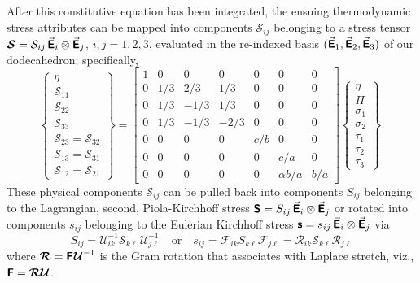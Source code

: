 After this constitutive equation has been integrated, the ensuing thermo\-dynamic stress attributes can be mapped into components $\mathcal{S}_{ij}$ belonging to a stress tensor $\boldsymbol{\mathcal{S}} = \mathcal{S}_{ij} \, \vec{\boldsymbol{\mathsf{E}}}_i \otimes \vec{\boldsymbol{\mathsf{E}}}_j$, $i, j = 1, 2, 3$, evaluated in the re-indexed basis $( \vec{\boldsymbol{\mathsf{E}}}_1 , \vec{\boldsymbol{\mathsf{E}}}_2 , \vec{\boldsymbol{\mathsf{E}}}_3 )$ of our dodecahedron; specifically,
\begin{equation}
\left\{ \begin{matrix}
\eta \\ \mathcal{S}_{11} \\ \mathcal{S}_{22} \\ \mathcal{S}_{33} \\
\mathcal{S}_{23} = \mathcal{S}_{32} \\
\mathcal{S}_{13} = \mathcal{S}_{31} \\
\mathcal{S}_{12} = \mathcal{S}_{21}
\end{matrix} \right\} = \begin{bmatrix}
1 & 0 & 0 & 0 & 0 & 0 & 0 \\
0 & 1/3 & 2/3 & 1/3 & 0 & 0 & 0 \\
0 & 1/3 & -1/3 & 1/3 & 0 & 0 & 0 \\
0 & 1/3 & -1/3 & -2/3 & 0 & 0 & 0 \\
0 & 0 & 0 & 0 & c/b & 0 & 0 \\
0 & 0 & 0 & 0 & 0 & c/a & 0 \\
0 & 0 & 0 & 0 & 0 & \alpha b/a & b/a
\end{bmatrix}
\left\{ \begin{matrix}
\eta \\ \Pi \\ \sigma_1 \\ \sigma_2 \\ \tau_1 \\ \tau_2 \\ \tau_3
\end{matrix} \right\} .
\end{equation}
These physical components $\mathcal{S}_{ij}$ can be pulled back into components $S_{ij}$ belonging to the Lagrangian, second, Piola-Kirchhoff stress $\boldsymbol{\mathsf{S}} = S_{ij} \, \vec{\boldsymbol{\mathsf{E}}}_i \otimes \vec{\boldsymbol{\mathsf{E}}}_j$ or rotated into components $s_{ij}$ belonging to the Eulerian Kirchhoff stress $\boldsymbol{\mathsf{s}} = s_{ij} \, \vec{\boldsymbol{\mathsf{E}}}_i \otimes \vec{\boldsymbol{\mathsf{E}}}_j$ via 
\begin{equation}
S_{ij} = \mathcal{U}^{-1}_{ik} \mathcal{S}_{k\ell\,} \mathcal{U}^{-1}_{j\ell}
\quad \text{or} \quad
s_{ij} = \mathcal{F}_{ik} S_{k\ell} \mathcal{F}_{j\ell} = 
\mathcal{R}_{ik} \mathcal{S}_{k\ell} \mathcal{R}_{j\ell}
\end{equation}
where $\boldsymbol{\mathcal{R}} = \boldsymbol{\mathsf{F}} \hspace{0.5pt} \boldsymbol{\mathcal{U}}^{-1}$ is the Gram rotation that associates with Laplace stretch, viz., $\boldsymbol{\mathsf{F}} = \boldsymbol{\mathcal{RU}}$.

